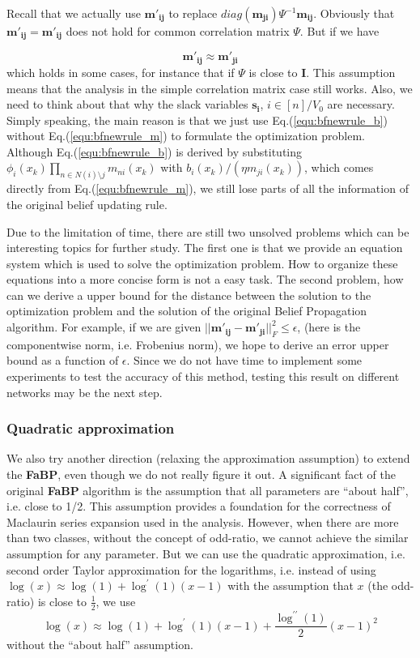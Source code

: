 Recall that we actually use $\mathbf{m'_{ij}}$ to replace $diag(\mathbf{m_{ji}})\Psi^{-1} \mathbf{m_{ij}}$. Obviously that $\mathbf{m'_{ij}} = \mathbf{m'_{ij}}$ does not hold for common correlation matrix $\Psi$. But if we have

$$\mathbf{m'_{ij}} \approx \mathbf{m'_{ji}}$$
which holds in some cases, for instance that if $\Psi$ is close to $\mathbf{I}$. This assumption means that the analysis in the simple correlation matrix case still works. Also, we need to think about that why the slack variables $\mathbf{s_i}$, $i\in [n]/V_0$ are necessary. Simply speaking, the main reason is that we just use Eq.(\ref{equ:bfnewrule_b}) without Eq.(\ref{equ:bfnewrule_m}) to formulate the optimization problem. Although Eq.(\ref{equ:bfnewrule_b}) is derived by substituting $\phi_i(x_k)\prod_{n\in N(i)\setminus j} m_{ni}(x_k)$ with $b_i(x_k)/(\eta m_{ji}(x_k))$, which comes directly from Eq.(\ref{equ:bfnewrule_m}), we still lose parts of all the information of the original belief updating rule.

Due to the limitation of time, there are still two unsolved problems which can be interesting topics for further study. The first one is that we provide an equation system which is used to solve the optimization problem. How to organize these equations into a more concise form is not a easy task. The second problem, how can we derive a upper bound for the distance between the solution to the optimization problem and the solution of the original Belief Propagation algorithm. For example, if we are given $||\mathbf{m'_{ij}} - \mathbf{m'_{ji}}||_F^2 \leq \epsilon$, (here is the componentwise norm, i.e. Frobenius norm), we hope to derive an error upper bound as a function of $\epsilon$. Since we do not have time to implement some experiments to test the accuracy of this method, testing this result on different networks may be the next step.

\subsubsection{Quadratic approximation}
We also try another direction (relaxing the approximation assumption) to extend the \textbf{FaBP}, even though we do not really figure it out. A significant fact of the original \textbf{FaBP} algorithm is the assumption that all parameters are ``about half'', i.e. close to 1/2. This assumption provides a foundation for the correctness of Maclaurin series expansion used in the analysis. However, when there are more than two classes, without the concept of odd-ratio, we cannot achieve the similar assumption for any parameter. But we can use the quadratic approximation, i.e. second order Taylor approximation for the logarithms, i.e. instead of using $\log(x) \approx \log(1)+\log^{\prime}(1)(x-1)$ with the assumption that $x$ (the odd-ratio) is close to $\frac{1}{2}$, we use
$$\log(x)\approx \log(1)+\log^{\prime}(1)(x-1)+\frac{\log^{\prime\prime}(1)}{2}(x-1)^2$$
without the ``about half'' assumption.

